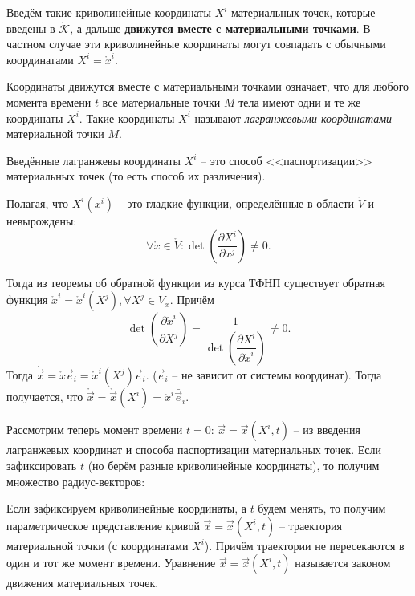 Введём такие криволинейные координаты $X^i$ материальных точек, которые введены в
$\mathring{\mathcal{K}}$, а дальше \textbf{движутся вместе с материальными точками}. В частном
случае эти криволинейные координаты могут совпадать с обычными координатами $X^i = \mathring{x}^i$.

\begin{figure}[H]
	\centering
	
\end{figure}


Координаты движутся вместе с материальными точками означает, что для любого момента времени $t$ 
все материальные точки $M$ тела имеют одни и те же координаты $X^i$. Такие координаты $X^i$ называют
\emph{лагранжевыми координатами} материальной точки $M$.

Введённые лагранжевы координаты $X^i$ -- это способ <<паспортизации>> материальных точек (то есть
способ их различения).

Полагая, что $X^i(x^i)$ -- это гладкие функции, определённые в области $\mathring{V}$ и невырождены:
\[
  \forall \mathring{x} \in \mathring V : \det \left( \dfrac{\partial X^i}{\partial x^j}  \right) \neq 0.
\]

Тогда из теоремы об обратной функции из курса ТФНП существует обратная функция $\mathring{x}^i
= \mathring{x}^i (X^j), \forall X^j \in V_x$. Причём
\[
  \det \left( \dfrac{\partial \mathring{x}^i}{\partial X^{j}}  \right)
  = \dfrac{1}{\det \left( \dfrac{\partial X^i}{\partial \mathring{x}^i}  \right) } \neq 0.
\]
Тогда $\mathring{\vec{x}} = \mathring{x} \bar{\vec{e}}_i = \mathring{x}^i (X^j) \bar{\vec{e}}_i$.
($\bar{\vec{e}}_i$ -- не зависит от системы координат). Тогда получается, что
$\mathring{\vec{x}} = \mathring{\vec{x}} ( X^i) = \mathring{x}^i \bar{\vec{e}}_i$.

Рассмотрим теперь момент времени $t = 0$: $\vec{x} = \vec{x}(X^i, t)$ -- из введения лагранжевых 
координат и способа паспортизации материальных точек. Если зафиксировать $t$ (но берём разные
криволинейные координаты), то получим множество радиус-векторов:

\begin{figure}[H]
	\centering
	
\end{figure}

Если зафиксируем криволинейные координаты, а $t$ будем менять, то получим параметрическое
представление кривой $\vec{x} = \vec{x} ( X^i, t )$ -- траектория материальной точки (с координатами
$X^i$). Причём траектории не пересекаются в один и тот же момент времени. Уравнение $\vec{x} = \vec{x}(X^i, t)$ называется законом движения материальных точек.

